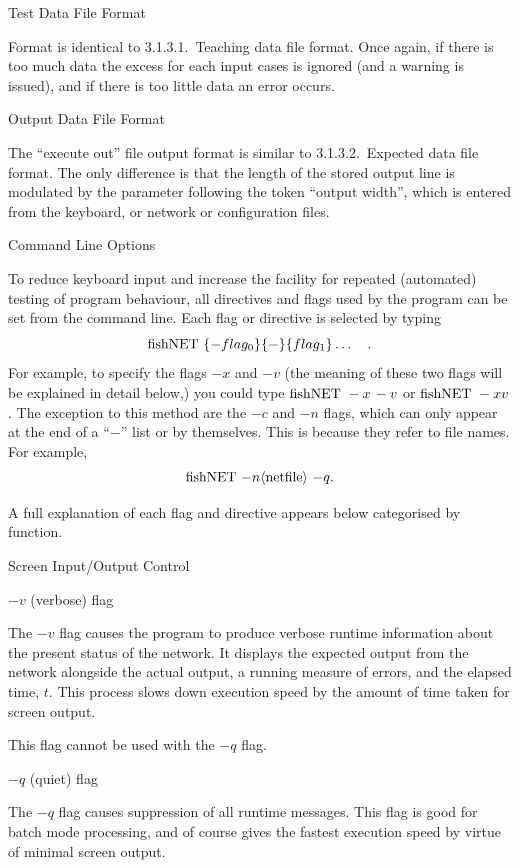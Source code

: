 \sssec Test Data File Format

Format is identical to 3.1.3.1.~Teaching data file format.
Once again, if there is too much data the excess for each input
cases is ignored (and a warning is issued), and if there is too
little data an error occurs.

\sssec Output Data File Format

The ``execute out'' file output format is similar to 3.1.3.2.~Expected
data file format.
The only difference is that the length of the stored output line is
modulated by the parameter following the token ``output width'',
which is entered from the keyboard, or network or configuration
files.

\ssec Command Line Options

To reduce keyboard input and increase the facility for repeated
(automated) testing of program behaviour, all directives and flags
used by the program can be set from the command line.
Each flag or directive is selected by typing
$$
{\rm fishNET\ } \{-flag_0\}\{-\}\{flag_1\}\ldots\quad.
$$
For example, to specify the flags $-x$ and $-v$ (the meaning of
these two flags will be explained in detail below,) you could type
${\rm fishNET\ } -x {\rm \thinspace} -v$ or ${\rm fishNET\ } -xv$.
The exception to this method are the $-c$ and $-n$ flags, which can
only appear at the end of a ``$-$'' list or by themselves.
This is because they refer to file names.
For example,
$$
\hbox{fishNET\ $-n\langle{\rm netfile}\rangle$\ $-q$.}
$$

A full explanation of each flag and directive appears below
categorised by function.

\sssec Screen Input/Output Control

\ssssec $-v$ (verbose) flag

The $-v$ flag causes the program to produce verbose runtime
information about the present status of the network.
It displays the expected output from the network alongside the
actual output, a running measure of errors, and the elapsed time,
$t$.
This process slows down execution speed by the amount of time taken
for screen output.

This flag cannot be used with the $-q$ flag.

\ssssec $-q$ (quiet) flag

The $-q$ flag causes suppression of all runtime messages.
This flag is good for batch mode processing, and of course gives the
fastest execution speed by virtue of minimal screen output.

